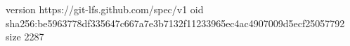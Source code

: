 version https://git-lfs.github.com/spec/v1
oid sha256:be5963778df335647c667a7e3b7132f11233965ec4ac4907009d5ecf25057792
size 2287
